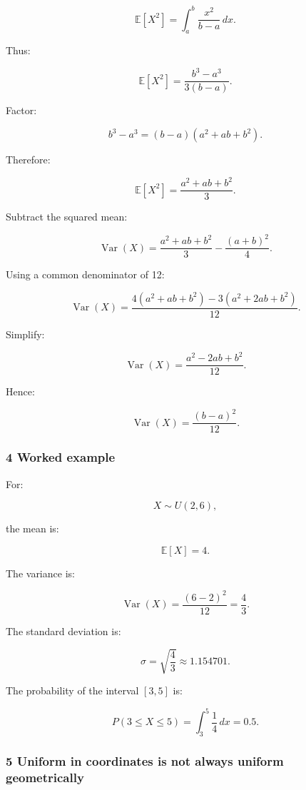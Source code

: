 \[
 \mathbb E[X^2] = \int_a^b\frac{x^2}{b-a}\,dx.
\]

Thus:

\[
 \mathbb E[X^2] = \frac{b^3-a^3}{3(b-a)}.
\]

Factor:

\[
 b^3-a^3=(b-a)(a^2+ab+b^2).
\]

Therefore:

\[
 \mathbb E[X^2] = \frac{a^2+ab+b^2}{3}.
\]

Subtract the squared mean:

\[
 \operatorname{Var}(X) = \frac{a^2+ab+b^2}{3} -\frac{(a+b)^2}{4}.
\]

Using a common denominator of 12:

\[
 \operatorname{Var}(X) = \frac{ 4(a^2+ab+b^2)-3(a^2+2ab+b^2) }{12}.
\]

Simplify:

\[
 \operatorname{Var}(X) = \frac{a^2-2ab+b^2}{12}.
\]

Hence:

\[
 \boxed{ \operatorname{Var}(X)=\frac{(b-a)^2}{12} }.
\]

\begin{allmightroleexample}

\subsubsection{4 Worked example}\label{02-foundations-ii-ch023-worked-example-1}

\hypertarget{02-foundations-ii-ch023-worked-example-1}{}

For:

\end{allmightroleexample}

\[
 X\sim U(2,6),
\]

the mean is:

\[
 \mathbb E[X]=4.
\]

The variance is:

\[
 \operatorname{Var}(X) = \frac{(6-2)^2}{12} = \boxed{\frac43}.
\]

The standard deviation is:

\[
 \sigma=\sqrt{\frac43}\approx1.154701.
\]

The probability of the interval \([3,5]\) is:

\[
 P(3\le X\le5) = \int_3^5\frac14\,dx =\boxed{0.5}.
\]

\subsubsection{5 Uniform in coordinates is not always uniform geometrically}\label{02-foundations-ii-ch023-uniform-in-coordinates-is-not-always-uniform-geometrically}

